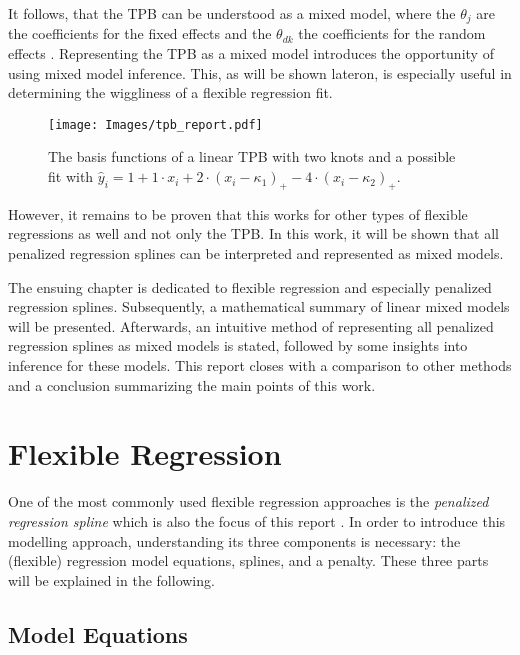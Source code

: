 \documentclass[12pt]{article}
\begin{document}
It follows, that the TPB can be understood as a mixed model, where the $\theta_j$ are the coefficients for the fixed effects and the $\theta_{dk}$ the coefficients for the random effects \cite{ruppert2003semiparametric}. Representing the TPB as a mixed model introduces the opportunity of using mixed model inference. This, as will be shown lateron, is especially useful in determining the wiggliness of a flexible regression fit.

\begin{figure}
\begin{center}
\vspace{2em}
\texttt{[image: Images/tpb\_report.pdf]}
\end{center}
\vspace{-2em}
\caption[caption]{The basis functions of a linear TPB with two knots and a possible fit with $\hat{y}_i = 1 + 1 \cdot x_i +  2 \cdot(x_i-\kappa_1)_+ - 4\cdot (x_i-\kappa_2)_+.$}\label{tpb}
\end{figure}

However, it remains to be proven that this works for other types of flexible regressions as well and not only the TPB. 
In this work, it will be shown that all penalized regression splines can be interpreted and represented as mixed models. 

The ensuing chapter is dedicated to flexible regression and especially penalized regression splines. Subsequently, a mathematical summary of linear mixed models will be presented. Afterwards, an intuitive method of representing all penalized regression splines as mixed models is stated, followed by some insights into inference for these models. This report closes with a comparison to other methods and a conclusion summarizing the main points of this work.


\section{Flexible Regression}

One of the most commonly used flexible regression approaches is the \textit{penalized regression spline} which is also the focus of this report \cite{fahrmeir2013regression, ruppert2003semiparametric, wood2017generalized}. In order to introduce this modelling approach, understanding its three components is necessary: the (flexible) regression model equations, splines, and a penalty. These three parts will be explained in the following.

\subsection{Model Equations}
\end{document}
